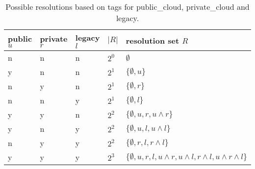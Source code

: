 \documentclass[../main.tex]{subfiles}
\begin{document}
    \begin{table}[h]
        \centering
        \begin{tabular}{llllp{3cm}}
            \toprule
            \textbf{public $u$} & \textbf{private $r$} & \textbf{legacy $l$} & \textbf{$|R|$} &\textbf{resolution set $R$} \\ \midrule
            n & n & n & $2^0$ & $\emptyset$ \\ \midrule
            y & n & n & $2^1$ & $\{\emptyset,u\}$ \\ \midrule
            n & y & n & $2^1$ & $\{\emptyset,r\}$ \\ \midrule
            n & n & y & $2^1$ & $\{\emptyset,l\}$ \\ \midrule
            y & y & n & $2^2$ & $\{\emptyset,u,r,u\land r\}$ \\ \midrule
            y & n & y & $2^2$ & $\{\emptyset,u,l,u\land l\}$ \\ \midrule
            n & y & y & $2^2$ & $\{\emptyset,r,l,r\land l\}$ \\ \midrule
            y & y & y & $2^3$ & $\{\emptyset,u,r,l,u\land r,u\land l,r\land l,u\land r\land l\}$ \\
            \bottomrule
        \end{tabular}
        \captionsetup{justification=centering}
        \caption{
            Possible resolutions based on tags for \gls{public_cloud}, \gls{private_cloud} and legacy.
        }
        \label{tab:tag_resolution_sets}
    \end{table}
\end{document}
